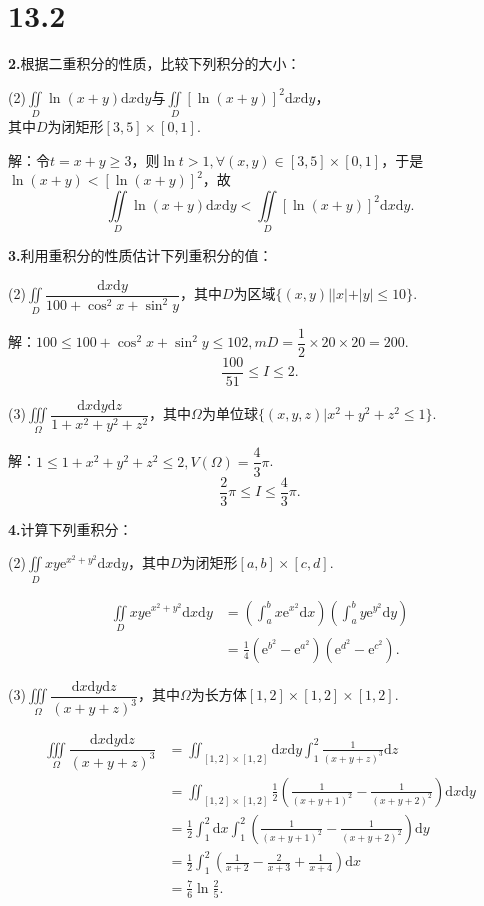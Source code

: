 \documentclass[12pt, a4paper]{article}
\newcommand{\e}{\mathrm{e}}
\newcommand{\dif}{\mathrm{d}}
\begin{document}
\section*{13.2}
\textbf{2.}根据二重积分的性质，比较下列积分的大小：

(2)\(\iint\limits_D \ln(x + y) \dif x \dif y\)与\(\iint\limits_D [\ln(x + y)]^2 \dif x \dif y\)，\\
其中\(D\)为闭矩形\([3, 5] \times [0, 1]\).

解：令\(t = x + y \geq 3\)，则\(\ln t > 1, \forall (x, y) \in [3, 5] \times [0, 1]\)，于是\(\ln(x + y) < [\ln(x + y)]^2\)，故
\[\iint\limits_D \ln(x + y) \dif x \dif y < \iint\limits_D [\ln(x + y)]^2 \dif x \dif y.\]

\textbf{3.}利用重积分的性质估计下列重积分的值：

(2)\(\iint\limits_D \dfrac{\dif x \dif y}{100 + \cos^2 x + \sin^2 y}\)，其中\(D\)为区域\(\{(x, y)||x| + |y| \leq 10\}\).

解：\(100 \leq 100 + \cos^2 x + \sin^2 y \leq 102, mD = \dfrac{1}{2} \times 20 \times 20 = 200\).
\[\dfrac{100}{51} \leq I \leq 2.\]

(3)\(\iiint\limits_\Omega \dfrac{\dif x \dif y \dif z}{1 + x^2 + y^2 + z^2}\)，其中\(\Omega\)为单位球\(\{(x, y, z)|x^2 + y^2 + z^2 \leq 1\}\).

解：\(1 \leq 1 + x^2 + y^2 + z^2 \leq 2, V(\Omega) = \dfrac{4}{3}\pi\).
\[\dfrac{2}{3}\pi \leq I \leq \dfrac{4}{3}\pi.\]

\textbf{4.}计算下列重积分：

(2)\(\iint\limits_D xy\e^{x^2 + y^2} \dif x \dif y\)，其中\(D\)为闭矩形\([a, b] \times [c, d]\).

\begin{align*}
\iint\limits_D xy\e^{x^2 + y^2} \dif x \dif y &= \left(\int_a^b x\e^{x^2} \dif x\right)\left(\int_a^b y\e^{y^2} \dif y\right) \\
&= \frac{1}{4}\left(\e^{b^2} - \e^{a^2}\right)\left(\e^{d^2} - \e^{c^2}\right).
\end{align*}

(3)\(\iiint\limits_\Omega \dfrac{\dif x \dif y \dif z}{(x + y + z)^3}\)，其中\(\Omega\)为长方体\([1, 2] \times [1, 2] \times [1, 2]\).

\begin{align*}
\iiint\limits_\Omega \dfrac{\dif x \dif y \dif z}{(x + y + z)^3} &= \iint_{[1, 2] \times [1, 2]} \dif x \dif y \int_1^2 \frac{1}{(x + y + z)^3} \dif z \\
&= \iint_{[1, 2] \times [1, 2]} \frac{1}{2}\left(\frac{1}{(x + y + 1)^2} - \frac{1}{(x + y + 2)^2}\right) \dif x \dif y \\
&= \frac{1}{2} \int_1^2 \dif x \int_1^2 \left(\frac{1}{(x + y + 1)^2} - \frac{1}{(x + y + 2)^2}\right) \dif y \\
&= \frac{1}{2} \int_1^2 \left(\frac{1}{x + 2} - \frac{2}{x + 3} + \frac{1}{x + 4}\right) \dif x \\
&= \frac{7}{6} \ln\frac{2}{5}.
\end{align*}
\end{document}

